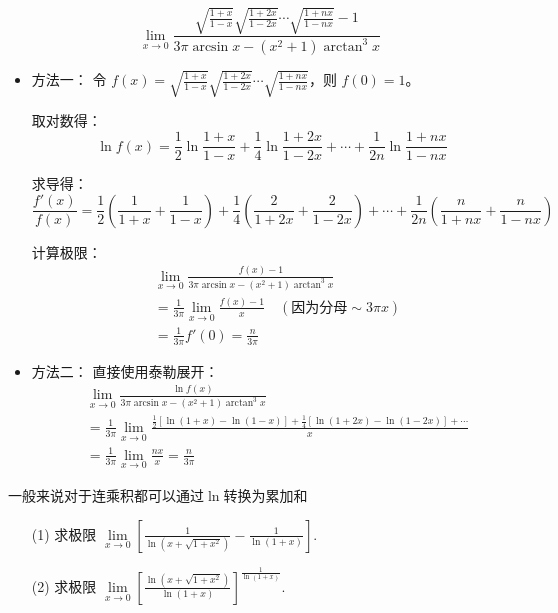 \documentclass[12pt, a4paper, oneside, UTF8]{ctexbook}
\begin{document}
\begin{solution}
$$ \lim_{x \to 0}\frac{\sqrt{\frac{1+x}{1-x}}\sqrt{\frac{1+2x}{1-2x}}\cdots\sqrt{\frac{1+nx}{1-nx}}-1}{3\pi\arcsin x - (x^2+1)\arctan^3 x} $$

\begin{itemize}
\item 方法一：
令 $f(x)=\sqrt{\frac{1+x}{1-x}}\sqrt{\frac{1+2x}{1-2x}}\cdots\sqrt{\frac{1+nx}{1-nx}}$，则 $f(0)=1$。

取对数得：
$$ \ln f(x) = \frac{1}{2}\ln\frac{1+x}{1-x} + \frac{1}{4}\ln\frac{1+2x}{1-2x} + \cdots + \frac{1}{2n}\ln\frac{1+nx}{1-nx} $$

求导得：
$$ \frac{f'(x)}{f(x)} = \frac{1}{2}\left(\frac{1}{1+x}+\frac{1}{1-x}\right) + \frac{1}{4}\left(\frac{2}{1+2x}+\frac{2}{1-2x}\right) + \cdots + \frac{1}{2n}\left(\frac{n}{1+nx}+\frac{n}{1-nx}\right) $$

计算极限：
\begin{align*}
&\lim_{x\to 0}\frac{f(x)-1}{3\pi\arcsin x - (x^2+1)\arctan^3 x} \\
&= \frac{1}{3\pi}\lim_{x\to 0}\frac{f(x)-1}{x} \quad (\text{因为分母}\sim 3\pi x) \\
&= \frac{1}{3\pi}f'(0) = \frac{n}{3\pi}
\end{align*}

\item 方法二：
直接使用泰勒展开：
\begin{align*}
&\lim_{x\to 0}\frac{\ln f(x)}{3\pi\arcsin x - (x^2+1)\arctan^3 x} \\
&= \frac{1}{3\pi}\lim_{x\to 0}\frac{\frac{1}{2}[\ln(1+x)-\ln(1-x)] + \frac{1}{4}[\ln(1+2x)-\ln(1-2x)] + \cdots}{x} \\
&= \frac{1}{3\pi}\lim_{x\to 0}\frac{nx}{x} = \frac{n}{3\pi}
\end{align*}
\end{itemize}
\end{solution}
\begin{remark}
    一般来说对于连乘积都可以通过$\ln$转换为累加和
\end{remark}
\begin{example}
\begin{enumerate}
    \item[(1)]求极限 $\lim\limits_{x\to 0}\left[\frac{1}{\ln(x+\sqrt{1+x^{2}})}-\frac{1}{\ln(1+x)}\right]$.
    \item[(2)]求极限 $\lim\limits_{x\to 0}\left[\frac{\ln(x+\sqrt{1+x^{2}})}{\ln(1+x)}\right]^{\frac{1}{\ln(1+x)}}$.
\end{enumerate}
\end{example}
\end{document}
